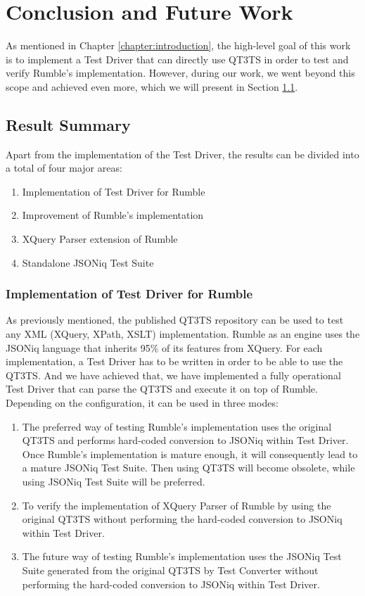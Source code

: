 \chapter{Conclusion and Future Work} 
\label{chapter:conclusions}
As mentioned in Chapter \ref{chapter:introduction}, the high-level goal of this work is to implement a Test Driver that can directly use QT3TS in order to test and verify Rumble's implementation. However, during our work, we went beyond this scope and achieved even more, which we will present in Section \ref{sec:overallsummary}.

\section{Result Summary}
\label{sec:overallsummary}
Apart from the implementation of the Test Driver, the results can be divided into a total of four major areas:
\begin{enumerate}
	\item Implementation of Test Driver for Rumble
	\item Improvement of Rumble's implementation
	\item XQuery Parser extension of Rumble
	\item Standalone JSONiq Test Suite
\end{enumerate}

\subsection{Implementation of Test Driver for Rumble}
As previously mentioned, the published QT3TS repository \cite{TestSuiteGitHubRepository} can be used to test any XML (XQuery, XPath, XSLT) implementation. Rumble as an engine uses the JSONiq language that inherits 95\% of its features from XQuery. For each implementation, a Test Driver has to be written in order to be able to use the QT3TS. And we have achieved that, we have implemented a fully operational Test Driver that can parse the QT3TS and execute it on top of Rumble. Depending on the configuration, it can be used in three modes:
\begin{enumerate}
	\item The preferred way of testing Rumble's implementation uses the original QT3TS and performs hard-coded conversion to JSONiq within Test Driver. Once Rumble's implementation is mature enough, it will consequently lead to a mature JSONiq Test Suite. Then using QT3TS will become obsolete, while using JSONiq Test Suite will be preferred.
	\item  To verify the implementation of XQuery Parser of Rumble by using the original QT3TS without performing the hard-coded conversion to JSONiq within Test Driver.
	\item The future way of testing Rumble's implementation uses the JSONiq Test Suite generated from the original QT3TS by Test Converter without performing the hard-coded conversion to JSONiq within Test Driver.
\end{enumerate} 

